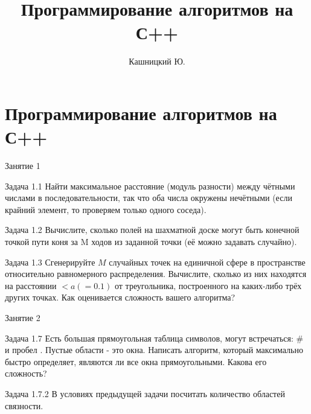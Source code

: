\documentclass[unicode,10pt]{beamer}
\title[ML\&DM]{Программирование алгоритмов на С++}
\author[]{Кашницкий Ю.}
\begin{document}
\section{Программирование алгоритмов на С++}

\begin{frame}{Занятие 1}
\begin{block}{Задача 1.1}
Найти максимальное расстояние (модуль разности) между чётными числами в последовательности, так что оба числа окружены нечётными
 (если крайний элемент, то проверяем только одного соседа).
\end{block}

\begin{block}{Задача 1.2}
Вычислите, сколько полей на шахматной доске могут быть конечной точкой пути коня за M ходов из заданной точки (её можно задавать случайно).
\end{block}

\begin{block}{Задача 1.3}
Сгенерируйте $M$ случайных точек на единичной сфере в пространстве относительно равномерного распределения. 
Вычислите, сколько из них находятся на расстоянии $ < a ( = 0.1 )$ от треугольника, построенного на каких-либо трёх других точках. 
Как оценивается сложность вашего алгоритма? 
\end{block}

\end{frame}
\begin{frame}{Занятие 2}

\begin{block}{Задача 1.7}
Есть большая прямоугольная таблица символов, могут встречаться: \# и пробел . 
Пустые области - это окна. Написать алгоритм, который максимально быстро определяет, являются ли все окна прямоугольными. Какова его сложность? 
\end{block}

\begin{block}{Задача 1.7.2}
В условиях предыдущей задачи посчитать количество областей связности. 
\end{block}



\end{frame}
\end{document}
